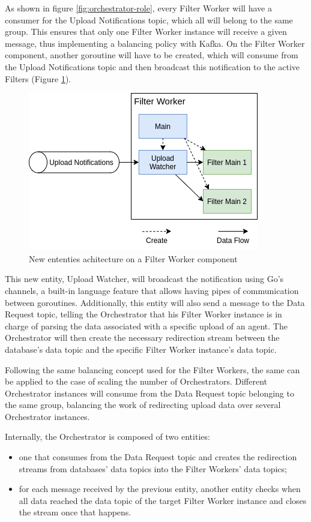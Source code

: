 As shown in figure \ref{fig:orchestrator-role}, every Filter Worker will have a consumer for the Upload Notifications topic, which all will belong to the same group.
This ensures that only one Filter Worker instance will receive a given message, thus implementing a balancing policy with Kafka.
On the Filter Worker component, another goroutine will have to be created, which will consume from the Upload Notifications topic and then broadcast this notification to the active Filters (Figure \ref{fig:filter-worker-uploads}).
\begin{figure}[H]
    \center
    \includegraphics[width=.6\textwidth]{filter-worker-uploads}
    \caption{New ententies achitecture on a Filter Worker component}
    \label{fig:filter-worker-uploads}
\end{figure}
This new entity, Upload Watcher, will broadcast the notification using Go's channels, a built-in language feature that allows having pipes of communication between goroutines.
Additionally, this entity will also send a message to the Data Request topic, telling the Orchestrator that his Filter Worker instance is in charge of parsing the data associated with a specific upload of an agent.
The Orchestrator will then create the necessary redirection stream between the database's data topic and the specific Filter Worker instance's data topic.

Following the same balancing concept used for the Filter Workers, the same can be applied to the case of scaling the number of Orchestrators.
Different Orchestrator instances will consume from the Data Request topic belonging to the same group, balancing the work of redirecting upload data over several Orchestrator instances.

Internally, the Orchestrator is composed of two entities:
\begin{itemize}
    \item one that consumes from the Data Request topic and creates the redirection streams from databases' data topics into the Filter Workers' data topics;
    \item for each message received by the previous entity, another entity checks when all data reached the data topic of the target Filter Worker instance and closes the stream once that happens.
\end{itemize}

